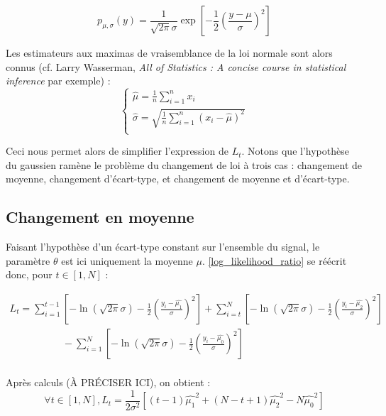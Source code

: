 \documentclass[french,12pt,notitlepage]{report}
\begin{document}
	\begin{equation*}
		p_{\mu, \sigma}(y) = \frac1{\sqrt{2 \pi} \sigma} \exp \left[ -\frac12 \left( \frac{y - \mu}{\sigma} \right)^2 \right]
	\end{equation*}
	
	Les estimateurs aux maximas de vraisemblance de la loi normale sont alors connus (cf. Larry Wasserman, \textit{All of Statistics : A concise course in statistical inference} par exemple) :
	\begin{equation}
	\left\{
	\begin{array}{ll}
		\hat{\mu} = \frac{1}{n} \sum_{i=1}^n x_i \\
		\hat{\sigma} = \sqrt{\frac{1}{n} \sum_{i=1}^n (x_i - \hat{\mu})^2} \\
	\end{array}
	\right.
	\label{estimators}
	\end{equation}
	
	Ceci nous permet alors de simplifier l'expression de $L_t$. Notons que l'hypothèse du gaussien ramène le problème du changement de loi à trois cas : changement de moyenne, changement d'écart-type, et changement de moyenne et d'écart-type.
	
	\subsection{Changement en moyenne}
	Faisant l'hypothèse d'un écart-type constant sur l'ensemble du signal, le paramètre $\theta$ est ici uniquement la moyenne $\mu$. \ref{log_likelihood_ratio} se réécrit donc, pour $t \in [1,N]$ :
	
	\begin{equation*}
	\begin{array}{ll}
		L_t = \sum_{i=1}^{t-1} \left[-\ln (\sqrt{2 \pi} \sigma)-\frac{1}{2}\left( \frac{y_i-\hat{\mu_1}}{\sigma} \right) ^2 \right] + \sum_{i=t}^{N} \left[-\ln (\sqrt{2 \pi} \sigma)-\frac{1}{2}\left( \frac{y_i-\hat{\mu_2}}{\sigma} \right) ^2 \right] \\
		~~~~~~~~~~~~~~~~~~~~~~~~ - \sum_{i=1}^{N} \left[-\ln (\sqrt{2 \pi} \sigma)-\frac{1}{2}\left( \frac{y_i-\hat{\mu_0}}{\sigma} \right) ^2 \right] \\
	\end{array}
	\end{equation*}
	
	Après calculs (À PRÉCISER ICI), on obtient :
	\begin{equation}
		\forall t \in [1, N], L_t = \frac{1}{2 \sigma ^2}\left[(t-1)\hat{\mu_1}^2 + (N - t + 1)\hat{\mu_2}^2 - N\hat{\mu_0}^2 \right]
		\label{meanchange}
	\end{equation}
	
\end{document}
